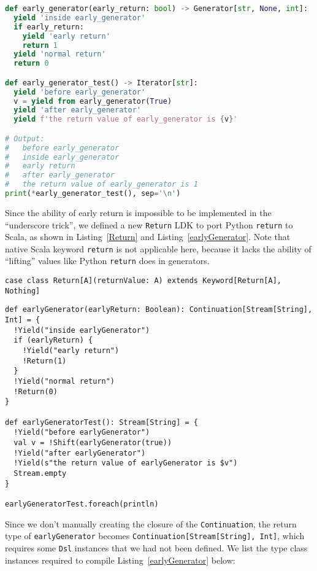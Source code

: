 \begin{lstlisting}[language=Python,style=Python3,caption={Use \lstinline{yield from} and \lstinline{return} in Python generators},label={early_generator}]
def early_generator(early_return: bool) -> Generator[str, None, int]:
  yield 'inside early_generator'
  if early_return:
    yield 'early return'
    return 1
  yield 'normal return'
  return 0

def early_generator_test() -> Iterator[str]:
  yield 'before early_generator'
  v = yield from early_generator(True)
  yield 'after early_generator'
  yield f'the return value of early_generator is {v}'

# Output:
#   before early_generator
#   inside early_generator
#   early return
#   after early_generator
#   the return value of early_generator is 1
print(*early_generator_test(), sep='\n')
\end{lstlisting}

Since the ability of early return is impossible to be implemented in the ``underscore trick'', we defined a new \lstinline{Return} LDK to port Python \lstinline{return} to Scala, as shown in Listing~\ref{Return} and Listing~\ref{earlyGenerator}. Note that native Scala keyword \lstinline{return} is not applicable here, because it lacks the ability of ``lifting'' values like Python \lstinline{return} does in generators.


\begin{lstlisting}[caption={The definition of \lstinline{Return} LDK},label={Return}]
case class Return[A](returnValue: A) extends Keyword[Return[A], Nothing]
\end{lstlisting}

\begin{lstlisting}[caption={Use \lstinline{Shift} and \lstinline{Return} in LDK-based generators},label={earlyGenerator}]
def earlyGenerator(earlyReturn: Boolean): Continuation[Stream[String], Int] = {
  !Yield("inside earlyGenerator")
  if (earlyReturn) {
    !Yield("early return")
    !Return(1)
  }
  !Yield("normal return")
  !Return(0)
}

def earlyGeneratorTest(): Stream[String] = {
  !Yield("before earlyGenerator")
  val v = !Shift(earlyGenerator(true))
  !Yield("after earlyGenerator")
  !Yield(s"the return value of earlyGenerator is $v")
  Stream.empty
}

earlyGeneratorTest.foreach(println)
\end{lstlisting}

Since we don't manually creating the closure of the \lstinline{Continuation}, the return type of \lstinline{earlyGenerator} becomes \lstinline{Continuation[Stream[String], Int]}, which requires some \lstinline{Dsl} instances that we had not been defined. We list the type class instances required to compile Listing~\ref{earlyGenerator} below:

